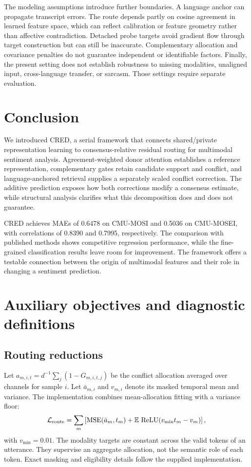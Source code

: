 \documentclass[review,12pt]{elsarticle}
\newcommand{\E}{\mathbb{E}}
\begin{document}
The modeling assumptions introduce further boundaries. A language anchor can propagate transcript errors. The route depends partly on cosine agreement in learned feature space, which can reflect calibration or feature geometry rather than affective contradiction. Detached probe targets avoid gradient flow through target construction but can still be inaccurate. Complementary allocation and covariance penalties do not guarantee independent or identifiable factors. Finally, the present setting does not establish robustness to missing modalities, unaligned input, cross-language transfer, or sarcasm. Those settings require separate evaluation.

\section{Conclusion}
We introduced CRED, a serial framework that connects shared/private representation learning to consensus-relative residual routing for multimodal sentiment analysis. Agreement-weighted donor attention establishes a reference representation, complementary gates retain candidate support and conflict, and language-anchored retrieval supplies a separately scaled conflict correction. The additive prediction exposes how both corrections modify a consensus estimate, while structural analysis clarifies what this decomposition does and does not guarantee.

CRED achieves MAEs of 0.6478 on CMU-MOSI and 0.5036 on CMU-MOSEI, with correlations of 0.8390 and 0.7995, respectively. The comparison with published methods shows competitive regression performance, while the fine-grained classification results leave room for improvement. The framework offers a testable connection between the origin of multimodal features and their role in changing a sentiment prediction.

\appendix
\section{Auxiliary objectives and diagnostic definitions}
\label{app:objectives}
\subsection{Routing reductions}
Let $a_{m,i,t}=d^{-1}\sum_j(1-G_{m,i,t,j})$ be the conflict allocation averaged over channels for sample $i$. Let $\bar a_{m,i}$ and $v_{m,i}$ denote its masked temporal mean and variance. The implementation combines mean-allocation fitting with a variance floor:
\begin{equation}
\mathcal L_{\rm route}=\sum_m\left[
\operatorname{MSE}(\bar a_m,t_m)
+\E\,\operatorname{ReLU}(v_{\min}t_m-v_m)\right],
\label{eq:route_appendix}
\end{equation}
with $v_{\min}=0.01$. The modality targets are constant across the valid tokens of an utterance. They supervise an aggregate allocation, not the semantic role of each token. Exact masking and eligibility details follow the supplied implementation.
\end{document}
